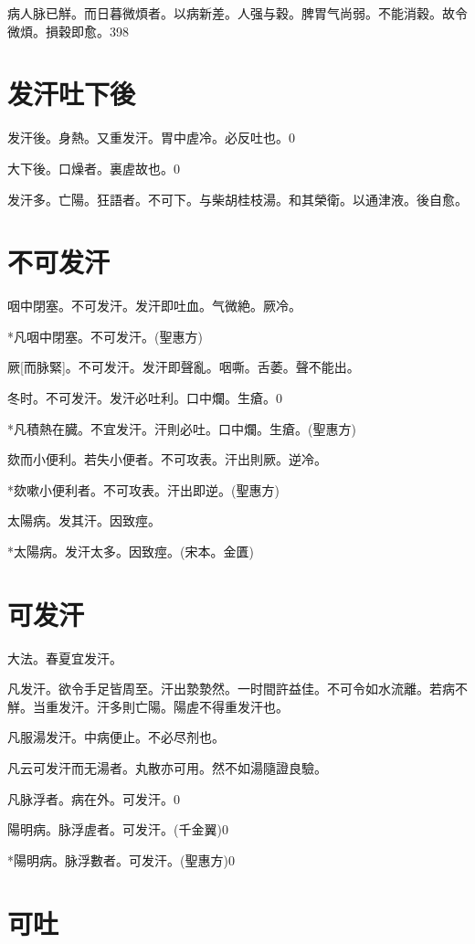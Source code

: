 \documentclass[12pt,twoside,UTF8,b5paper]{ctexbook}
\begin{document}
病人脉已觧。而日暮微煩者。以病新差。人强与穀。脾胃气尚弱。不能消穀。故令微煩。損穀即愈。398

\chapter{发汗吐下後}

发汗後。身熱。又重发汗。胃中虗冷。必反吐也。0

大下後。口燥者。裏虗故也。0

发汗多。亡陽。狂語者。不可下。与柴胡桂枝湯。和其榮衛。以通津液。後自愈。

\chapter{不可发汗}

咽中閉塞。不可发汗。发汗即吐血。气微絶。厥冷。

*凡咽中閉塞。不可发汗。(聖惠方)

厥[而脉緊]。不可发汗。发汗即聲亂。咽嘶。舌萎。聲不能出。

冬时。不可发汗。发汗必吐利。口中爛。生瘡。0

*凡積熱在臓。不宜发汗。汗則必吐。口中爛。生瘡。(聖惠方)

欬而小便利。若失小便者。不可攻表。汗出則厥。逆冷。

*欬嗽小便利者。不可攻表。汗出即逆。(聖惠方)

太陽病。发其汗。因致痙。

*太陽病。发汗太多。因致痙。(宋本。金匱)

\chapter{可发汗}

大法。春夏宜发汗。

凡发汗。欲令手足皆周至。汗出漐漐然。一时間許益佳。不可令如水流離。若病不觧。当重发汗。汗多則亡陽。陽虗不得重发汗也。

凡服湯发汗。中病便止。不必尽剂也。

凡云可发汗而无湯者。丸散亦可用。然不如湯隨證良驗。

凡脉浮者。病在外。可发汗。0

陽明病。脉浮虗者。可发汗。(千金翼)0

*陽明病。脉浮數者。可发汗。(聖惠方)0

\chapter{可吐}
\end{document}
